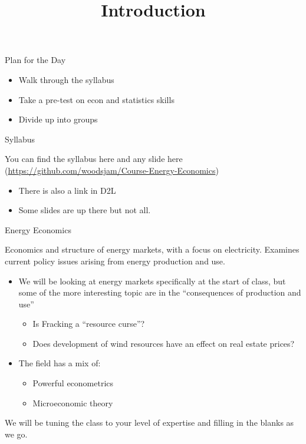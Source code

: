 \documentclass[
  ignorenonframetext,
]{beamer}
\title{Introduction}
\date{}
\providecommand{\tightlist}{%
  \setlength{\itemsep}{0pt}\setlength{\parskip}{0pt}}
\begin{document}
\frame{\titlepage}

\begin{frame}{Plan for the Day}
\protect\hypertarget{plan-for-the-day}{}

\begin{itemize}
\tightlist
\item
  Walk through the syllabus
\item
  Take a pre-test on econ and statistics skills
\item
  Divide up into groups
\end{itemize}

\end{frame}

\begin{frame}{Syllabus}
\protect\hypertarget{syllabus}{}

You can find the syllabus here and any slide here
(\url{https://github.com/woodsjam/Course-Energy-Economics})

\begin{itemize}
\tightlist
\item
  There is also a link in D2L
\item
  Some slides are up there but not all.
\end{itemize}

\end{frame}

\begin{frame}{Energy Economics}
\protect\hypertarget{energy-economics}{}

Economics and structure of energy markets, with a focus on electricity.
Examines current policy issues arising from energy production and use.

\begin{itemize}
\tightlist
\item
  We will be looking at energy markets specifically at the start of
  class, but some of the more interesting topic are in the
  ``consequences of production and use''

  \begin{itemize}
  \tightlist
  \item
    Is Fracking a ``resource curse''?
  \item
    Does development of wind resources have an effect on real estate
    prices?
  \end{itemize}
\item
  The field has a mix of:

  \begin{itemize}
  \tightlist
  \item
    Powerful econometrics
  \item
    Microeconomic theory
  \end{itemize}
\end{itemize}

We will be tuning the class to your level of expertise and filling in
the blanks as we go.

\end{frame}
\end{document}
